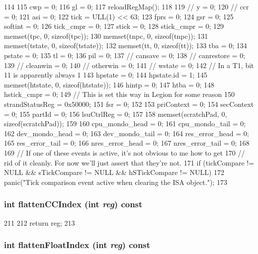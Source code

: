 \begin{DoxyCode}
114 {
115     cwp = 0;
116     gl = 0;
117     reloadRegMap();
118 
119     // y = 0;
120     // ccr = 0;
121     asi = 0;
122     tick = ULL(1) << 63;
123     fprs = 0;
124     gsr = 0;
125     softint = 0;
126     tick_cmpr = 0;
127     stick = 0;
128     stick_cmpr = 0;
129     memset(tpc, 0, sizeof(tpc));
130     memset(tnpc, 0, sizeof(tnpc));
131     memset(tstate, 0, sizeof(tstate));
132     memset(tt, 0, sizeof(tt));
133     tba = 0;
134     pstate = 0;
135     tl = 0;
136     pil = 0;
137     // cansave = 0;
138     // canrestore = 0;
139     // cleanwin = 0;
140     // otherwin = 0;
141     // wstate = 0;
142     // In a T1, bit 11 is apparently always 1
143     hpstate = 0;
144     hpstate.id = 1;
145     memset(htstate, 0, sizeof(htstate));
146     hintp = 0;
147     htba = 0;
148     hstick_cmpr = 0;
149     // This is set this way in Legion for some reason
150     strandStatusReg = 0x50000;
151     fsr = 0;
152 
153     priContext = 0;
154     secContext = 0;
155     partId = 0;
156     lsuCtrlReg = 0;
157 
158     memset(scratchPad, 0, sizeof(scratchPad));
159 
160     cpu_mondo_head = 0;
161     cpu_mondo_tail = 0;
162     dev_mondo_head = 0;
163     dev_mondo_tail = 0;
164     res_error_head = 0;
165     res_error_tail = 0;
166     nres_error_head = 0;
167     nres_error_tail = 0;
168 
169     // If one of these events is active, it's not obvious to me how to get
170     // rid of it cleanly. For now we'll just assert that they're not.
171     if (tickCompare != NULL && sTickCompare != NULL && hSTickCompare != NULL)
172         panic("Tick comparison event active when clearing the ISA object.\n");
173 }
\end{DoxyCode}
\hypertarget{classSparcISA_1_1ISA_a7a5d7476bd10e5af09e6e753d1fca087}{
\subsubsection[{flattenCCIndex}]{\setlength{\rightskip}{0pt plus 5cm}int flattenCCIndex (int {\em reg}) const}}
\label{classSparcISA_1_1ISA_a7a5d7476bd10e5af09e6e753d1fca087}



\begin{DoxyCode}
211     {
212         return reg;
213     }
\end{DoxyCode}
\hypertarget{classSparcISA_1_1ISA_a85addcd4f57c5a0ffa81805dcad1eeb7}{
\subsubsection[{flattenFloatIndex}]{\setlength{\rightskip}{0pt plus 5cm}int flattenFloatIndex (int {\em reg}) const}}
\label{classSparcISA_1_1ISA_a85addcd4f57c5a0ffa81805dcad1eeb7}



